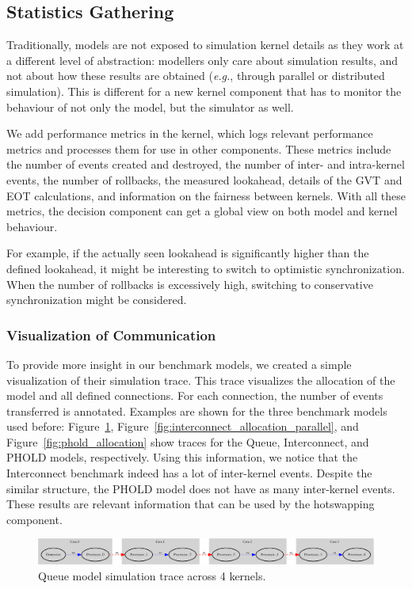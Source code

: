 \subsection{Statistics Gathering}
Traditionally, models are not exposed to simulation kernel details as they work at a different level of abstraction:
modellers only care about simulation results, and not about how these results are obtained (\textit{e.g.}, through parallel or distributed simulation).
This is different for a new kernel component that has to monitor the behaviour of not only the model, but the simulator as well.

We add performance metrics in the kernel, which logs relevant performance metrics and processes them for use in other components.
These metrics include the number of events created and destroyed, the number of inter- and intra-kernel events, the number of rollbacks, the measured lookahead, details of the GVT and EOT calculations, and information on the fairness between kernels.
With all these metrics, the decision component can get a global view on both model and kernel behaviour.

For example, if the actually seen lookahead is significantly higher than the defined lookahead, it might be interesting to switch to optimistic synchronization.
When the number of rollbacks is excessively high, switching to conservative synchronization might be considered.

\subsubsection{Visualization of Communication}
To provide more insight in our benchmark models, we created a simple visualization of their simulation trace.
This trace visualizes the allocation of the model and all defined connections.
For each connection, the number of events transferred is annotated.
Examples are shown for the three benchmark models used before: Figure~\ref{fig:Queue_allocation}, Figure~\ref{fig:interconnect_allocation_parallel}, and Figure~\ref{fig:phold_allocation} show traces for the Queue, Interconnect, and PHOLD models, respectively.
Using this information, we notice that the Interconnect benchmark indeed has a lot of inter-kernel events.
Despite the similar structure, the PHOLD model does not have as many inter-kernel events.
These results are relevant information that can be used by the hotswapping component.

\begin{figure}
    \center
    \includegraphics[width=\textwidth ]{fig/queue_allocation.eps}
    \caption{Queue model simulation trace across 4 kernels.}
    \label{fig:Queue_allocation}
\end{figure}

